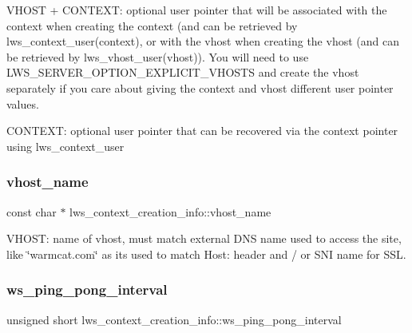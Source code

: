V\+H\+O\+ST + C\+O\+N\+T\+E\+XT\+: optional user pointer that will be associated with the context when creating the context (and can be retrieved by lws\+\_\+context\+\_\+user(context), or with the vhost when creating the vhost (and can be retrieved by lws\+\_\+vhost\+\_\+user(vhost)). You will need to use L\+W\+S\+\_\+\+S\+E\+R\+V\+E\+R\+\_\+\+O\+P\+T\+I\+O\+N\+\_\+\+E\+X\+P\+L\+I\+C\+I\+T\+\_\+\+V\+H\+O\+S\+TS and create the vhost separately if you care about giving the context and vhost different user pointer values.

C\+O\+N\+T\+E\+XT\+: optional user pointer that can be recovered via the context pointer using lws\+\_\+context\+\_\+user \mbox{\label{structlws__context__creation__info_a82d7895c929bd30d1136c9d8d790897f}} 
\subsubsection{\texorpdfstring{vhost\+\_\+name}{vhost\_name}}
{\footnotesize\ttfamily const char $\ast$ lws\+\_\+context\+\_\+creation\+\_\+info\+::vhost\+\_\+name}

V\+H\+O\+ST\+: name of vhost, must match external D\+NS name used to access the site, like \char`\"{}warmcat.\+com\char`\"{} as it\textquotesingle{}s used to match Host\+: header and / or S\+NI name for S\+SL. \mbox{\label{structlws__context__creation__info_a33a1a25a7df3793f59047e20dd580078}} 
\subsubsection{\texorpdfstring{ws\+\_\+ping\+\_\+pong\+\_\+interval}{ws\_ping\_pong\_interval}}
{\footnotesize\ttfamily unsigned short lws\+\_\+context\+\_\+creation\+\_\+info\+::ws\+\_\+ping\+\_\+pong\+\_\+interval}

